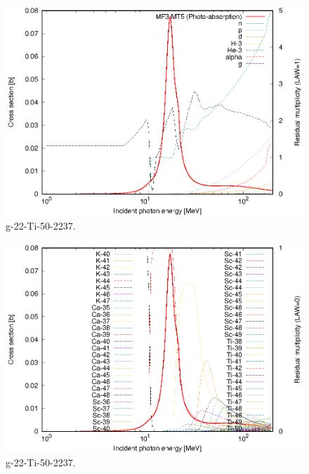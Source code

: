 \begin{figure}
 \includegraphics[width=\linewidth]{eps/g_22-Ti-50_2237.eps}
  \caption{g-22-Ti-50-2237.}
\end{figure}
\begin{figure}
 \includegraphics[width=\linewidth]{eps-law0/g_22-Ti-50_2237.eps}
 \caption{g-22-Ti-50-2237.}
\end{figure}
\newpage \clearpage

